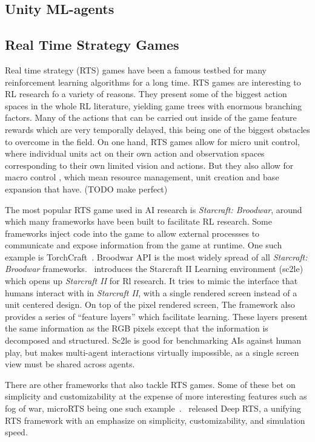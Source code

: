 \subsection{Unity ML-agents}

\subsection{Real Time Strategy Games}

Real time strategy (RTS) games have been a famous testbed for many reinforcement learning algorithms for a long time. RTS games are interesting to RL research fo a variety of reasons. They present some of the biggest action spaces in the whole RL literature, yielding game trees with enormous branching factors. Many of the actions that can be carried out inside of the game feature rewards which are very temporally delayed, this being one of the biggest obstacles to overcome in the field. On one hand, RTS games allow for micro unit control, where individual units act on their own action and observation spaces corresponding to their own limited vision and actions. But they also allow for macro control \citep{Wender2012}, which mean resource management, unit creation and base expansion that have. (TODO make perfect)

The most popular RTS game used in AI research is \textit{Starcraft: Broodwar}, around which many frameworks have been built to facilitate RL research. Some frameworks inject code into the game to allow external processses to communicate and expose information from the game at runtime. One such example is TorchCraft~\citep{Synnaeve2016}. Broodwar API \citep{Broodwar} is the most widely spread of all \textit{Starcraft: Broodwar} frameworks.~\citep{Vinyals2017} introduces the Starcraft II Learning environment (sc2le) which opens up \textit{Starcraft II} for Rl research. It tries to mimic the interface that humans interact with in \textit{Starcraft II}, with a single rendered screen instead of a unit centered design. On top of the pixel rendered screen, The framework also provides a series of ``feature layers'' which facilitate learning. These layers present the same information as the RGB pixels except that the information is decomposed and structured. Sc2le is good for benchmarking AIs against human play, but makes multi-agent interactions virtually impossible, as a single screen view must be shared across agents.

There are other frameworks that also tackle RTS games. Some of these bet on simplicity and customizability at the expense of more interesting features such as fog of war, microRTS being one such example~\citep{Ontanon2013}.~\cite{Andersen2017} released Deep RTS, a unifying RTS framework with an emphasize on simplicity, customizability, and simulation speed. 
